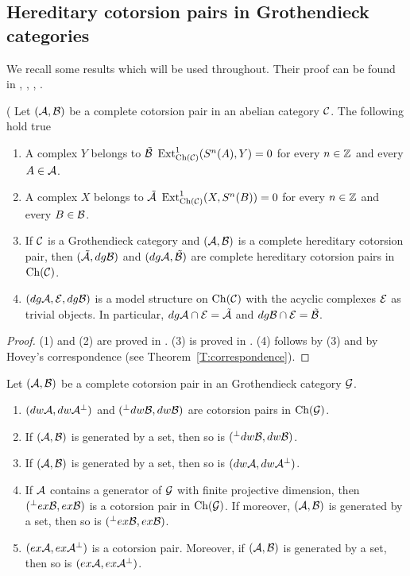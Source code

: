 \subsection{Hereditary cotorsion pairs in Grothendieck categories}

We recall some results which will be used throughout. Their proof can be found in \cite{St10-deconstr}, \cite{Sto13},  \cite{G4}, \cite{G6}.

 \begin{prop}\label{P:description-tilde} (\cite[Proposition 7.13, 7.14]{Sto13} Let $(\mathcal{A}, \mathcal{B})$ be a complete cotorsion pair in an abelian category $\mathcal{C}$. The following hold true
  \begin{enumerate}
  \item A complex $Y$ belongs to $\tilde{\mathcal{B}}$ \iff $\operatorname{Ext}^1_{\mathrm{Ch}(\mathcal{C})}(S^n(A), Y)=0$ for every $n\in \mathbb{Z}$ and every $A\in \mathcal{A}$.
  \item A complex $X$ belongs to $\tilde{\mathcal{A}}$ \iff $\operatorname{Ext}^1_{\mathrm{Ch}(\mathcal{C})}(X, S^n(B))=0$ for every $n\in \mathbb{Z}$ and every $B\in \mathcal{B}$.
  \item If $\mathcal{C}$ is a Grothendieck category and $(\mathcal{A}, \mathcal{B})$ is a complete hereditary cotorsion pair, then $(\tilde{\mathcal{A}}, dg\mathcal{B})$ and $(dg \mathcal{A}, \tilde {\mathcal{B}})$ are complete hereditary cotorsion pairs in $\mathrm{Ch}(\mathcal{C})$.

    \item $(dg\mathcal{A}, \mathcal{E}, dg\mathcal{B})$ is a model structure on $\mathrm{Ch}(\mathcal{C})$ with the acyclic complexes $\mathcal{E}$ as trivial objects. In particular, $dg\mathcal{A}\cap\mathcal{E}=\tilde {\mathcal{A}}$ and $dg\mathcal{B}\cap\mathcal{E}=\tilde {\mathcal{B}}$.
  \end{enumerate}
  \end{prop}
  \begin{proof}
 (1) and (2) are proved in \cite[Lemma 7.13]{Sto13}. (3) is proved in \cite[Proposition 7.14]{Sto13}.
  (4) follows by (3) and by Hovey's correspondence (see Theorem~\ref{T:correspondence}).
  \end{proof}
   \begin{prop}\label{P:complete?} Let $(\mathcal{A}, \mathcal{B})$ be a complete cotorsion pair in an Grothendieck category $\mathcal{G}$.
 \begin{enumerate}
  \item $(dw\mathcal{A}, dw\mathcal{A}^\perp)$ and $(^\perp dw\mathcal{B}, dw\mathcal{B})$ are cotorsion pairs in $\mathrm{Ch}(\mathcal{G})$.
  \item If $(\mathcal{A}, \mathcal{B})$ is generated by a set, then so is $(^\perp dw\mathcal{B}, dw\mathcal{B})$.
  \item If $(\mathcal{A}, \mathcal{B})$ is generated by a set, then so is $(dw\mathcal{A}, dw\mathcal{A}^\perp)$.

  \item If $\mathcal{A}$ contains a generator of $\mathcal{G}$ with finite projective dimension,
  then $(^\perp ex\mathcal{B}, ex\mathcal{B})$ is a cotorsion pair in $\mathrm{Ch}(\mathcal{G})$. If moreover, $(\mathcal{A}, \mathcal{B})$ is generated by a set, then so is $(^\perp ex\mathcal{B}, ex\mathcal{B})$.
  \item $(ex\mathcal{A}, ex\mathcal{A}^\perp)$ is a cotorsion pair. Moreover, if $(\mathcal{A}, \mathcal{B})$ is generated by a set, then so is $(ex\mathcal{A}, ex\mathcal{A}^\perp)$.


   \end{enumerate}
  \end{prop}
